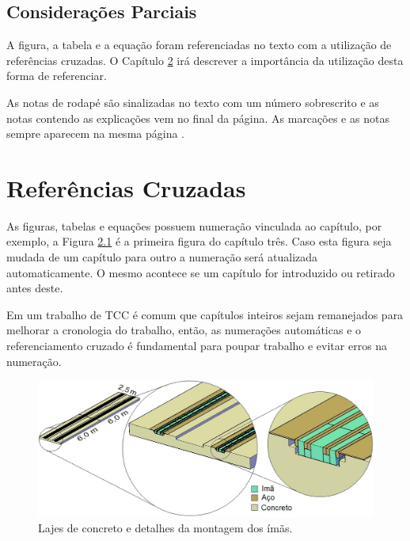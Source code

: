 \documentclass[
        oneside,      %
        english,			
        brazil			 
        ]{configcefetmglpd}
\begin{document}
\section{Considerações Parciais}
A figura, a tabela e a equação foram referenciadas no texto com a utilização de referências cruzadas. O Capítulo \ref{cap:ref_cruzadas} irá descrever a importância da utilização desta forma de referenciar.

As notas de rodapé são sinalizadas no texto com um número sobrescrito e as notas contendo as explicações vem no final da página. As marcações e as notas sempre aparecem na mesma página .

\chapter{Referências Cruzadas} \label{cap:ref_cruzadas}
As figuras, tabelas e equações possuem numeração vinculada ao capítulo, por exemplo, a Figura \ref{fig:lajes_concreto} é a primeira figura do capítulo três. Caso esta figura seja mudada de um capítulo para outro a numeração será atualizada automaticamente. O mesmo acontece se um capítulo for introduzido ou retirado antes deste.

Em um trabalho de TCC é comum que capítulos inteiros sejam remanejados para melhorar a cronologia do trabalho, então, as numerações automáticas e o referenciamento cruzado é fundamental para poupar trabalho e evitar erros na numeração.

\begin{figure}[h]
	\larguratexto{12cm}  %
	\caption{Lajes de concreto e detalhes da montagem dos ímãs.}
	\label{fig:lajes_concreto}
	\begin{center}
		\includegraphics[width=12cm]{cap4_1.jpg}
	\end{center}
\end{figure}
\end{document}
